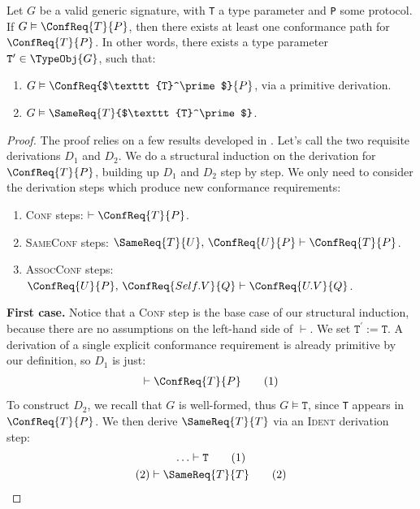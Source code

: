 \documentclass[../generics]{subfiles}
\begin{document}
\begin{theorem}\label{conformance paths theorem} Let $G$ be a valid generic signature, with \texttt{T} a type parameter and \texttt{P} some protocol. If $G\vDash\ConfReq{T}{P}$, then there exists at least one conformance path for $\ConfReq{T}{P}$. In other words, there exists a type parameter $\texttt{T}^\prime\in\TypeObj{G}$, such that:
\begin{enumerate}
\item $G\vDash\ConfReq{$\texttt{T}^\prime$}{P}$, via a primitive derivation.
\item $G\vDash\SameReq{T}{$\texttt{T}^\prime$}$.
\end{enumerate}
\end{theorem}
\begin{proof}
The proof relies on a few results developed in . Let's call the two requisite derivations $D_1$ and $D_2$. We do a structural induction on the derivation for $\ConfReq{T}{P}$, building up $D_1$ and $D_2$ step by step. We only need to consider the derivation steps which produce new conformance requirements:
\begin{enumerate}
\item {}\textsc{Conf} steps: $\vdash\ConfReq{T}{P}$.
\item {}\textsc{SameConf} steps: $\SameReq{T}{U},\,\ConfReq{U}{P}\vdash\ConfReq{T}{P}$.
\item {}\textsc{AssocConf} steps: $\ConfReq{U}{P},\,\ConfReq{Self.V}{Q}\vdash\ConfReq{U.V}{Q}$.
\end{enumerate}

\noindent \textbf{First case.} Notice that a \textsc{Conf} step is the base case of our structural induction, because there are no assumptions on the left-hand side of $\vdash$. We set $\texttt{T}^\prime := \texttt{T}$. A derivation of a single explicit conformance requirement is already primitive by our definition, so $D_1$ is just:
\begin{gather*}
\vdash\ConfReq{T}{P}\tag{1}
\end{gather*}
To construct $D_2$, we recall that $G$ is well-formed, thus $G\vDash\texttt{T}$, since \texttt{T} appears in $\ConfReq{T}{P}$. We then derive $\SameReq{T}{T}$ via an \textsc{Ident} derivation step:
\begin{gather*}
\ldots\vdash\texttt{T}\tag{1}\\
(2)\vdash\SameReq{T}{T}\tag{2}
\end{gather*}


\end{proof}
\end{document}
